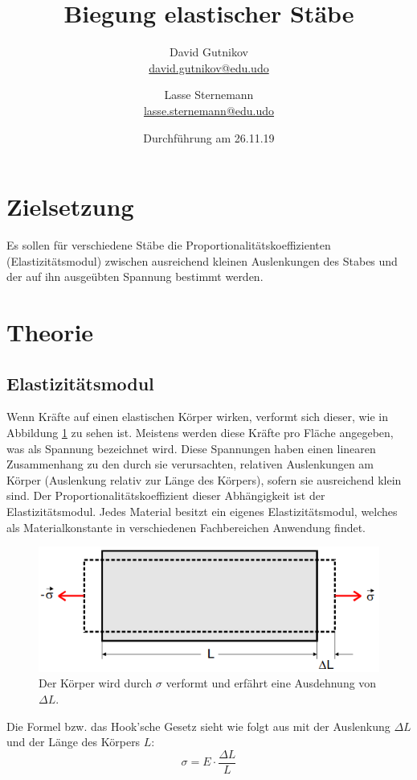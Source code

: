 \documentclass[titlepage = firstcover]{scrartcl}
\title{Biegung elastischer Stäbe}
\author{
  David Gutnikov \\
  \href{mailto:david.gutnikov@edu.udo}{david.gutnikov@edu.udo} \and
  Lasse Sternemann \\
  \href{mailto:lasse.sternemann@edu.udo}{lasse.sternemann@edu.udo}}
\date{Durchführung am 26.11.19}
\begin{document}
    \maketitle
    \tableofcontents
    \newpage
    
    \section{Zielsetzung}
      Es sollen für verschiedene Stäbe die Proportionalitätskoeffizienten (Elastizitätsmodul) zwischen ausreichend kleinen Auslenkungen des Stabes und der auf ihn ausgeübten Spannung bestimmt werden.

    \section{Theorie}
      \subsection{Elastizitätsmodul}
        Wenn Kräfte auf einen elastischen Körper wirken, verformt sich dieser, wie in Abbildung \ref{fig:verformung}
        zu sehen ist. Meistens werden diese Kräfte pro Fläche angegeben, was als Spannung bezeichnet wird.
        Diese Spannungen haben einen linearen Zusammenhang zu den durch sie verursachten, relativen Auslenkungen am
        Körper (Auslenkung relativ zur Länge des Körpers), sofern sie ausreichend klein sind.
        Der Proportionalitätskoeffizient dieser Abhängigkeit ist der Elastizitätsmodul. Jedes Material besitzt ein
        eigenes Elastizitätsmodul, welches als Materialkonstante in verschiedenen Fachbereichen Anwendung findet.
        \begin{figure}[h]
          \centering
          \includegraphics[width=0.75\linewidth]{Verformung.png}
          \caption{Der Körper wird durch $\sigma$ verformt und erfährt eine Ausdehnung von $\Delta L$.}
          \label{fig:verformung}
        \end{figure}
        
        Die Formel bzw. das \glqq Hook'sche Gesetz\grqq{} sieht wie folgt aus mit der Auslenkung $\Delta L$ und der Länge des Körpers $L$:
        \begin{equation*}
          \sigma = E \cdot \frac{\Delta L}{L}
        \end{equation*}
        
\end{document}

